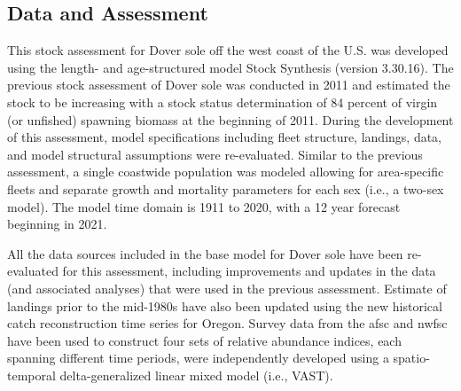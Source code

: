 \documentclass[11pt,
  english,
  a4paper,
]{article}
\begin{document}
\tagmcend\tagstructend

\clearpage


\hypertarget{data-and-assessment}{%
\subsection*{Data and Assessment}\label{data-and-assessment}}

\leavevmode\tagmcend\tagstructend


This stock assessment for Dover sole off the west coast of the U.S. was developed using the length- and age-structured model Stock Synthesis (version 3.30.16). The previous stock assessment of Dover sole was conducted in 2011 and estimated the stock to be increasing with a stock status determination of 84 percent of virgin (or unfished) spawning biomass at the beginning of 2011. During the development of this assessment, model specifications including fleet structure, landings, data, and model structural assumptions were re-evaluated. Similar to the previous assessment, a single coastwide population was modeled allowing for area-specific fleets and separate growth and mortality parameters for each sex (i.e., a two-sex model). The model time domain is 1911 to 2020, with a 12 year forecast beginning in 2021.

\leavevmode\tagmcend\tagstructend\par


All the data sources included in the base model for Dover sole have been re-evaluated for this assessment, including improvements and updates in the data (and associated analyses) that were used in the previous assessment. Estimate of landings prior to the mid-1980s have also been updated using the new historical catch reconstruction time series for Oregon. Survey data from the \gls{afsc} and \gls{nwfsc} have been used to construct four sets of relative abundance indices, each spanning different time periods, were independently developed using a spatio-temporal delta-generalized linear mixed model (i.e., VAST).

\leavevmode\tagmcend\tagstructend\par

\end{document}
